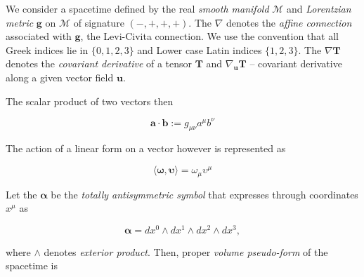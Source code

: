 
We consider a spacetime defined by the real \textit{smooth manifold} $\mathcal{M}$ and \textit{Lorentzian metric} $\boldsymbol{g}$ on $\mathcal{M}$ of signature $(-,+,+,+)$. 
The $\nabla$ denotes the \textit{affine connection} associated with $\boldsymbol{g}$, the Levi-Civita connection.
We use the convention that all Greek indices lie in $\{0, 1, 2, 3\}$ and Lower case Latin indices $\{1, 2, 3\}$.
The $\nabla\boldsymbol{T}$ denotes the \textit{covariant derivative} of a tensor $\boldsymbol{T}$ and $\nabla_{\boldsymbol{u}}\boldsymbol{T}$ -- covariant derivative along a given vector field $\boldsymbol{u}$.

The scalar product of two vectors then 

\begin{equation}
\boldsymbol{a}\cdot\boldsymbol{b}:=g_{\mu\nu}a^{\mu}b^{\nu}
\end{equation}

The action of a linear form on a vector however is represented as 

\begin{equation}
\langle\boldsymbol{\omega},\boldsymbol{\upsilon}\rangle=\omega_{\mu}\upsilon^{\mu}
\end{equation}

Let the $\boldsymbol{\alpha}$ be the \textit{totally antisymmetric symbol} that expresses through coordinates $x^{\mu}$ as

\begin{equation}
\boldsymbol{\alpha} = dx^0 \wedge dx^1 \wedge dx^2 \wedge dx^3,
\end{equation}

where $\wedge$ denotes \textit{exterior product}. 
Then, proper \textit{volume pseudo-form} of the spacetime is

